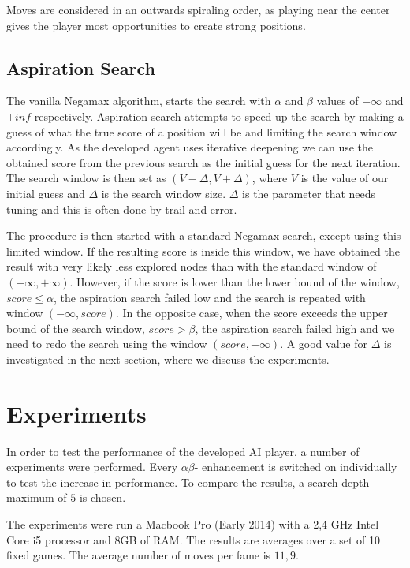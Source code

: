 \documentclass[11pt]{article}
\begin{document}


Moves are considered in an outwards spiraling order, as playing near the center gives the player most opportunities to create strong positions.

\subsection{Aspiration Search}
\label{-subsec:aspirationsearch}
The vanilla Negamax algorithm, starts the search with $\alpha$ and $\beta$ values of $-\infty$ and $+inf$ respectively. Aspiration search attempts to speed up the search by making a guess of what the true score of a position will be and limiting the search window accordingly. As the developed agent uses iterative deepening we can use the obtained score from the previous search as the initial guess for the next iteration. The search window is then set as $(V-\Delta, V+\Delta)$, where $V$ is the value of our initial guess and $\Delta$ is the search window size. $\Delta$ is the parameter that needs tuning and this is often done by trail and error. 

The procedure is then started with a standard Negamax search, except using this limited window. If the resulting score is inside this window, we have obtained the result with very likely less explored nodes than with the standard window of $(-\infty,+\infty)$. However, if the score is lower than the lower bound of the window, \ie $score \leq \alpha$, the aspiration search failed low and the search is repeated with window $(-\infty,score)$. In the opposite case, when the score exceeds the upper bound of the search window, \ie $score > \beta$, the aspiration search failed high and we need to redo the search using the window $(score, +\infty)$. A good value for $\Delta$ is investigated in the next section, where we discuss the experiments.

\section{Experiments}
\label{-sec:experiments}
In order to test the performance of the developed AI player, a number of experiments were performed. Every $\alpha\beta$- enhancement is switched on individually to test the increase in performance. To compare the results, a search depth maximum of $5$ is chosen.

The experiments were run a Macbook Pro (Early 2014) with a 2,4 GHz Intel Core i5 processor and 8GB of RAM. The results are averages over a set of 10 fixed games. The average number of moves per fame is $11,9$.
\end{document}
